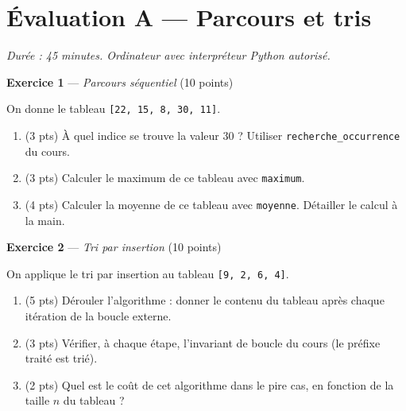 \section*{Évaluation A --- Parcours et tris}
\textit{Durée : 45 minutes. Ordinateur avec interpréteur Python autorisé.}


\bigskip

\textbf{Exercice 1} --- \textit{Parcours séquentiel} \hfill (10 points)

On donne le tableau \lstinline{[22, 15, 8, 30, 11]}.

\begin{enumerate}
  \item (3 pts) À quel indice se trouve la valeur $30$ ? Utiliser \lstinline{recherche_occurrence} du cours.
  \item (3 pts) Calculer le maximum de ce tableau avec \lstinline{maximum}.
  \item (4 pts) Calculer la moyenne de ce tableau avec \lstinline{moyenne}. Détailler le calcul à la main.
\end{enumerate}


\bigskip

\textbf{Exercice 2} --- \textit{Tri par insertion} \hfill (10 points)

On applique le tri par insertion au tableau \lstinline{[9, 2, 6, 4]}.

\begin{enumerate}
  \item (5 pts) Dérouler l'algorithme : donner le contenu du tableau après chaque itération de la boucle externe.
  \item (3 pts) Vérifier, à chaque étape, l'invariant de boucle du cours (le préfixe traité est trié).
  \item (2 pts) Quel est le coût de cet algorithme dans le pire cas, en fonction de la taille $n$ du tableau ?
\end{enumerate}

